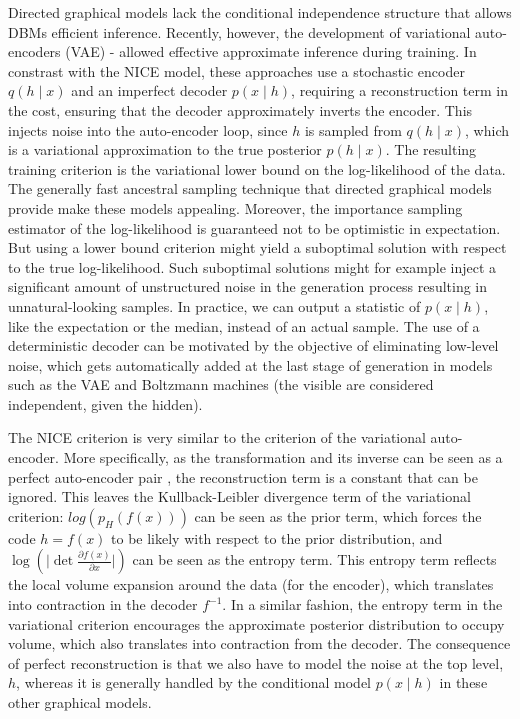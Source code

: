 \documentclass{article}
\begin{document}
Directed graphical models lack the conditional independence structure
that allows DBMs efficient inference.
Recently, however, the development of variational auto-encoders (VAE) 
\citep{Kingma+Welling-ICLR2014,
Rezende-et-al-arxiv2014,Mnih+Gregor-ICML2014,Gregor-et-al-ICML2014} - allowed
effective approximate inference during training.
In constrast with the NICE model, these approaches use
a stochastic encoder $q(h \mid x)$ and an imperfect decoder $p(x \mid h)$,
requiring a reconstruction
term in the cost, ensuring that
the decoder approximately inverts the encoder.
This injects noise into the auto-encoder loop, since $h$ is sampled from $q(h \mid x)$,
which is a variational approximation to the true posterior $p(h \mid x)$.
The resulting training criterion is the variational lower bound on the log-likelihood of the data.
The generally fast ancestral sampling technique that directed graphical models provide make these models appealing. 
Moreover, the importance sampling estimator of the log-likelihood is guaranteed not to be optimistic in expectation. 
But using a lower bound criterion might yield a suboptimal solution with respect to the true log-likelihood.
Such suboptimal solutions might for example inject a significant amount of unstructured noise in the generation
process resulting in unnatural-looking samples.
In practice, we can output a statistic of $p(x \mid h)$, like the expectation
or the median, instead of an actual sample. 
The use of a deterministic decoder can be motivated by the objective of eliminating low-level noise,
which gets automatically added at the last stage of generation in models 
such as the VAE and Boltzmann machines (the visible are considered independent, given the hidden).


The NICE criterion is very similar to the criterion of the variational auto-encoder.
More specifically, as the transformation and its
inverse can be seen as a perfect auto-encoder pair \citep{Bengio-arxiv2014},
the reconstruction term is a constant that can be ignored.
This leaves the Kullback-Leibler divergence term of the variational
criterion: $log(p_H(f(x)))$ can be seen as the prior term, which forces the
code $h=f(x)$ to be likely with respect to the prior distribution, and
$\log(\lvert \det \frac{\partial f(x)}{\partial x} \rvert)$ can be seen as
the entropy term. This entropy term reflects the local volume expansion around
the data (for the encoder), which translates into contraction in the decoder $f^{-1}$. In a
similar fashion, the entropy term in the variational criterion encourages
the approximate posterior distribution to occupy volume, which also translates
into contraction from the decoder.
The consequence of perfect reconstruction is
that we also have to model the noise at the top level, $h$, whereas it is generally handled by the
conditional model $p(x \mid h)$ in these other graphical models.
\end{document}
